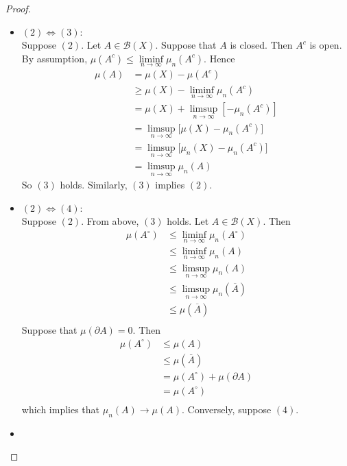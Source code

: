 \documentclass{book}
\theoremstyle{definition}
\newcommand{\MB}{\mathcal{B}}
\DeclareMathOperator*{\0}{\mbf{0}}
\DeclareMathOperator*{\1}{\mbf{1}}
\newcommand{\p}{\partial}
\newcommand{\limfn}{\liminf \limits_{n \rightarrow \infty}}
\newcommand{\limpn}{\limsup \limits_{n \rightarrow \infty}}
\begin{document}
	\begin{proof}\
		\begin{itemize}
			\item $(2) \iff (3)$: \\
			Suppose $(2)$. Let $A \in \MB(X)$. Suppose that $A$ is closed. Then $A^c$ is open. By assumption, $\mu(A^c) \leq \limfn \limits \mu_n(A^c)$. Hence 
			\begin{align*}
				\mu(A)
				&= \mu(X) - \mu(A^c) \\
				&\geq \mu(X) - \limfn \mu_n(A^c) \\
				&= \mu(X) + \limpn [- \mu_n(A^c)] \\
				&= \limpn \bigg[ \mu(X)  - \mu_n(A^c) \bigg] \\
				&= \limpn \bigg[ \mu_n(X)  - \mu_n(A^c) \bigg] \\
				&= \limpn \mu_n(A)
			\end{align*}
			So $(3)$ holds.
			Similarly, $(3)$ implies $(2)$.\\
			\item $(2) \iff (4)$: \\
			Suppose $(2)$. From above, $(3)$ holds. Let $A \in \MB(X)$. Then 
			\begin{align*}
				\mu(A^{\circ}) 
				& \leq \limfn \mu_n(A^{\circ}) \\
				& \leq  \limfn \mu_n(A) \\
				& \leq  \limpn \mu_n(A) \\
				& \leq  \limpn \mu_n(\overline{A}) \\
				& \leq  \mu(\overline{A}) \\
			\end{align*}
			Suppose that $\mu(\p A) = 0$. Then
			\begin{align*}
				\mu(A^{\circ}) 
				&\leq \mu(A) \\
				& \leq \mu(\overline{A}) \\
				&= \mu(A^{\circ}) + \mu(\p A) \\
				&= \mu(A^{\circ}) \\
			\end{align*}
			which implies that $\mu_n(A) \rightarrow \mu(A)$. Conversely, suppose $(4)$. 
			\item 
		\end{itemize}
	\end{proof}
\end{document}
